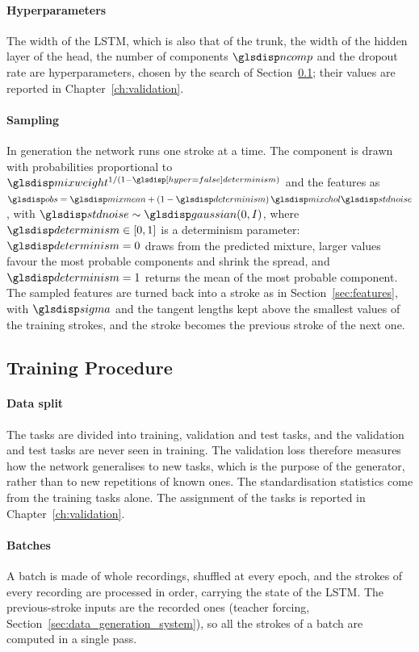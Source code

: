 \documentclass[12pt]{report}
\begin{document}
\paragraph{Hyperparameters}
The width of the LSTM, which is also that of the trunk, the width of the hidden layer of the head, the number of components $\sym{ncomp}$ and the dropout rate are hyperparameters, chosen by the search of Section~\ref{sec:training_procedure}; their values are reported in Chapter~\ref{ch:validation}.

\paragraph{Sampling}
In generation the network runs one stroke at a time. The component is drawn with probabilities proportional to $\sym{mixweight}_{i,k}^{1/(1-\sym*{determinism})}$ and the features as $\sym{obs}_i=\sym{mixmean}_{i,k}+(1-\sym{determinism})\,\sym{mixchol}_{i,k}\sym{stdnoise}$, with $\sym{stdnoise}\sim\sym{gaussian}(0,I)$, where $\sym{determinism}\in[0,1]$ is a determinism parameter: $\sym{determinism}=0$ draws from the predicted mixture, larger values favour the most probable components and shrink the spread, and $\sym{determinism}=1$ returns the mean of the most probable component. The sampled features are turned back into a stroke as in Section~\ref{sec:features}, with $\sym{sigma}$ and the tangent lengths kept above the smallest values of the training strokes, and the stroke becomes the previous stroke of the next one.

\subsection{Training Procedure}
\label{sec:training_procedure}

\paragraph{Data split}
The tasks are divided into training, validation and test tasks, and the validation and test tasks are never seen in training. The validation loss therefore measures how the network generalises to new tasks, which is the purpose of the generator, rather than to new repetitions of known ones. The standardisation statistics come from the training tasks alone. The assignment of the tasks is reported in Chapter~\ref{ch:validation}.

\paragraph{Batches}
A batch is made of whole recordings, shuffled at every epoch, and the strokes of every recording are processed in order, carrying the state of the LSTM. The previous-stroke inputs are the recorded ones (teacher forcing, Section~\ref{sec:data_generation_system}), so all the strokes of a batch are computed in a single pass.
\end{document}
